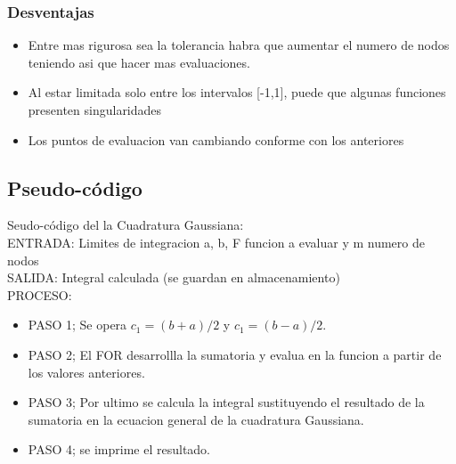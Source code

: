 \documentclass[journal,transmag]{IEEEtran}
\theoremstyle{mytheoremstyle}
\theoremstyle{mytheoremstyle}
\theoremstyle{myproblemstyle}
\begin{document}
                \subsubsection{Desventajas}
                        \begin{itemize}
                            \item  Entre mas rigurosa sea la tolerancia habra que aumentar el numero de nodos teniendo asi que hacer mas evaluaciones.
                            \item   Al estar limitada solo entre los intervalos [-1,1], puede que algunas funciones presenten singularidades
                            \item   Los puntos de evaluacion van cambiando conforme con los anteriores
                            
            
                    \end{itemize}
                
            \subsection{Pseudo-código}
                    Seudo-código del la Cuadratura Gaussiana: \cite{in_mr} \\
            
                    ENTRADA: Limites de integracion a, b, F funcion a evaluar y m numero de nodos \\
                    SALIDA: Integral calculada 
                    (se guardan en almacenamiento) \\
                    PROCESO: \\
                    
                            \begin{itemize}
                        \item   PASO 1; Se opera $c_1=(b+a)/2$ y $c_1=(b-a)/2$. \\
                        \item   PASO 2; El FOR desarrollla la sumatoria y evalua en la funcion a partir de los valores anteriores.\\
                        \item   PASO 3; Por ultimo se calcula la integral sustituyendo el resultado de la sumatoria en la ecuacion general de la cuadratura Gaussiana.\\
                        \item   PASO 4; se imprime el resultado. \\
                    \end{itemize}
                    
\end{document}
